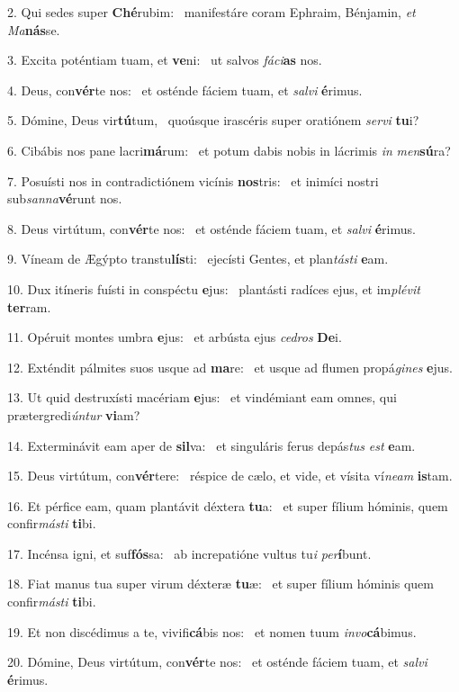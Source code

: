 2. Qui sedes super \textbf{Ché}rubim: \ast\  manifestáre coram Ephraim, Bénjamin, \textit{et} \textit{Ma}\textbf{nás}se.\

3. Excita poténtiam tuam, et \textbf{ve}ni: \ast\  ut salvos \textit{fá}\textit{ci}\textbf{as} nos.\

4. Deus, con\textbf{vér}te nos: \ast\  et osténde fáciem tuam, et \textit{sal}\textit{vi} \textbf{é}rimus.\

5. Dómine, Deus vir\textbf{tú}tum, \ast\  quoúsque irascéris super oratiónem \textit{ser}\textit{vi} \textbf{tu}i?\

6. Cibábis nos pane lacri\textbf{má}rum: \ast\  et potum dabis nobis in lácrimis \textit{in} \textit{men}\textbf{sú}ra?\

7. Posuísti nos in contradictiónem vicínis \textbf{nos}tris: \ast\  et inimíci nostri sub\textit{san}\textit{na}\textbf{vé}runt nos.\

8. Deus virtútum, con\textbf{vér}te nos: \ast\  et osténde fáciem tuam, et \textit{sal}\textit{vi} \textbf{é}rimus.\

9. Víneam de Ægýpto transtu\textbf{lís}ti: \ast\  ejecísti Gentes, et plan\textit{tás}\textit{ti} \textbf{e}am.\

10. Dux itíneris fuísti in conspéctu \textbf{e}jus: \ast\  plantásti radíces ejus, et im\textit{plé}\textit{vit} \textbf{ter}ram.\

11. Opéruit montes umbra \textbf{e}jus: \ast\  et arbústa ejus \textit{ce}\textit{dros} \textbf{De}i.\

12. Exténdit pálmites suos usque ad \textbf{ma}re: \ast\  et usque ad flumen propá\textit{gi}\textit{nes} \textbf{e}jus.\

13. Ut quid destruxísti macériam \textbf{e}jus: \ast\  et vindémiant eam omnes, qui prætergredi\textit{ún}\textit{tur} \textbf{vi}am?\

14. Exterminávit eam aper de \textbf{sil}va: \ast\  et singuláris ferus depás\textit{tus} \textit{est} \textbf{e}am.\

15. Deus virtútum, con\textbf{vér}tere: \ast\  réspice de cælo, et vide, et vísita ví\textit{ne}\textit{am} \textbf{is}tam.\

16. Et pérfice eam, quam plantávit déxtera \textbf{tu}a: \ast\  et super fílium hóminis, quem confir\textit{más}\textit{ti} \textbf{ti}bi.\

17. Incénsa igni, et suf\textbf{fós}sa: \ast\  ab increpatióne vultus tu\textit{i} \textit{per}\textbf{í}bunt.\

18. Fiat manus tua super virum déxteræ \textbf{tu}æ: \ast\  et super fílium hóminis quem confir\textit{más}\textit{ti} \textbf{ti}bi.\

19. Et non discédimus a te, vivifi\textbf{cá}bis nos: \ast\  et nomen tuum \textit{in}\textit{vo}\textbf{cá}bimus.\

20. Dómine, Deus virtútum, con\textbf{vér}te nos: \ast\  et osténde fáciem tuam, et \textit{sal}\textit{vi} \textbf{é}rimus.\

